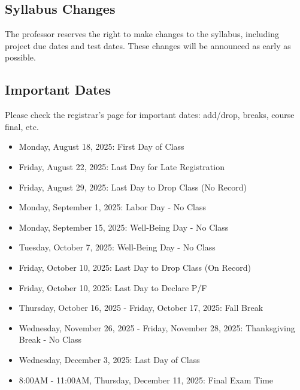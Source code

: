 \documentclass[11pt]{article}
\begin{document}
\subsection*{Syllabus Changes}
The professor reserves the right to make changes to the syllabus, including project due dates and test dates. These changes will be announced as early as possible.


\subsection*{Important Dates}   
Please check the registrar's page for important dates: add/drop, breaks, course final, etc.

\begin{itemize}
    \item Monday, August 18, 2025: First Day of Class
    \item Friday, August 22, 2025: Last Day for Late Registration
    \item Friday, August 29, 2025: Last Day to Drop Class (No Record)
    \item Monday, September 1, 2025: Labor Day - No Class
    \item Monday, September 15, 2025: Well-Being Day - No Class
    \item Tuesday, October 7, 2025: Well-Being Day - No Class
    \item Friday, October 10, 2025: Last Day to Drop Class (On Record)
    \item Friday, October 10, 2025: Last Day to Declare P/F
    \item Thursday, October 16, 2025 - Friday, October 17, 2025: Fall Break
    \item Wednesday, November 26, 2025 - Friday, November 28, 2025: Thanksgiving Break - No Class
    \item Wednesday, December 3, 2025: Last Day of Class
    \item 8:00AM - 11:00AM, Thursday, December 11, 2025: Final Exam Time
\end{itemize}

\end{document}
